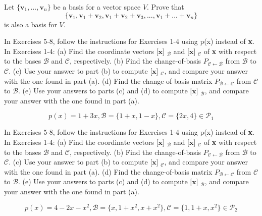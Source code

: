 \documentclass[11pt,letterpaper,boxed]{pset}
\begin{document}
    
    \begin{problem}[6.2 \#58]
    Let $\{\textbf{v}_1,...,\textbf{v}_n\}$ be a basis for a vector space $V$. Prove that 
    \[ \{ \textbf{v}_1, \textbf{v}_1+\textbf{v}_2, \textbf{v}_1+\textbf{v}_2+\textbf{v}_3,...,\textbf{v}_1+...+\textbf{v}_n \} \]
    is also a basis for $V$.
    \end{problem}
    \newpage
    
    
    \begin{problem}[6.3 \#6]
    In Exercises 5-8, follow the instructions for Exercises 1-4 using p(x) instead of \textbf{x}. In Exercises 1-4: (a) Find the coordinate vectors [$\textbf{x}$] $_{\mathscr{B}}$ and [$\textbf{x}$] $_{\mathscr{C}}$ of \textbf{x} with respect to the bases $\mathscr{B}$ and $\mathscr{C}$, respectively. (b) Find the change-of-basis $P_{\mathscr{C}\leftarrow\mathscr{B}}$ from $\mathscr{B}$ to $\mathscr{C}$. (c) Use your answer to part (b) to compute [$\textbf{x}$] $_{\mathscr{C}}$, and compare your answer with the one found in part (a). (d) Find the change-of-basis matrix $P_{\mathscr{B}\leftarrow\mathscr{C}}$ from $\mathscr{C}$ to $\mathscr{B}$. (e) Use your answers to parts (c) and (d) to compute [$\textbf{x}$] $_{\mathscr{B}}$, and compare your answer with the one found in part (a).
    
    \[ p(x)=1+3x, \mathscr{B}=\{1+x,1-x\}, \mathscr{C}=\{2x,4\} \in \mathscr{P}_1 \]
    
    \end{problem}
    \newpage
    
    
    \begin{problem}[6.3 \#8]
    In Exercises 5-8, follow the instructions for Exercises 1-4 using p(x) instead of \textbf{x}. In Exercises 1-4: (a) Find the coordinate vectors [$\textbf{x}$] $_{\mathscr{B}}$ and [$\textbf{x}$] $_{\mathscr{C}}$ of \textbf{x} with respect to the bases $\mathscr{B}$ and $\mathscr{C}$, respectively. (b) Find the change-of-basis $P_{\mathscr{C}\leftarrow\mathscr{B}}$ from $\mathscr{B}$ to $\mathscr{C}$. (c) Use your answer to part (b) to compute [$\textbf{x}$] $_{\mathscr{C}}$, and compare your answer with the one found in part (a). (d) Find the change-of-basis matrix $P_{\mathscr{B}\leftarrow\mathscr{C}}$ from $\mathscr{C}$ to $\mathscr{B}$. (e) Use your answers to parts (c) and (d) to compute [$\textbf{x}$] $_{\mathscr{B}}$, and compare your answer with the one found in part (a).
    
    \[ p(x)=4-2x-x^2, \mathscr{B}=\{x,1+x^2,x+x^2\}, \mathscr{C}=\{1,1+x,x^2\} \in \mathscr{P}_2 \]
    
    \end{problem}
    \newpage
    
\end{document}

